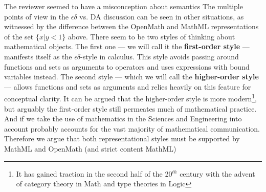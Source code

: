 \documentclass{llncs}
\begin{document}
\begin{newpart}{The reviewer seemed to have a misconception about semantics}
  The multiple points of view in the $\epsilon\delta$ vs. DA discussion 
can be seen in other situations, 
  as witnessed by the difference between the OpenMath and MathML representations of
  the set $\{x | y < 1\}$ above. There seem to be two styles of thinking about
  mathematical objects. The first one --- we will call it the {\textbf{first-order style}}
  --- manifests itself as the $\epsilon\delta$-style in calculus. This style avoids
  passing around functions and sets as arguments to operators and uses expressions with
  bound variables instead. The second style --- which we will call the
  {\textbf{higher-order style}} --- allows functions and sets as arguments and relies
  heavily on this feature for conceptual clarity. It can be argued that the higher-order
  style is more modern\footnote{It has gained traction in the second half of the 20$^{th}$
    century with the advent of category theory in Math and type theories in Logic}, but
  arguably the first-order style still permeates much of mathematical practice. And if we
  take the use of mathematics in the Sciences and Engineering into account probably
  accounts for the vast majority of mathematical communication. Therefore we argue that
  both representational styles must be supported by MathML and OpenMath (and strict
  content MathML)



\end{newpart}
\end{document}
